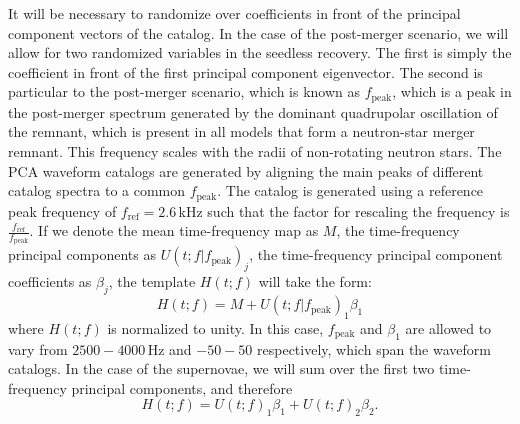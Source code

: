 \documentclass[prd,showpacs,superscriptaddress,twocolumn,
floatfix,preprintnumbers,altaffilletter]{revtex4}
\begin{document}
It will be necessary to randomize over coefficients in front of the principal component vectors of the catalog. 
In the case of the post-merger scenario, we will allow for two randomized variables in the seedless recovery. The first is simply the coefficient in front of the first principal component eigenvector. The second is particular to the post-merger scenario, which is known as $f_\textrm{peak}$, which is a peak in the post-merger spectrum generated by the dominant quadrupolar oscillation of the remnant, which is present in all models that form a neutron-star merger remnant. This frequency scales with the radii of non-rotating neutron stars. The PCA waveform catalogs are generated by aligning the main peaks of different catalog spectra to a common $f_\textrm{peak}$. The catalog is generated using a reference peak frequency of $f_\textrm{ref} = 2.6$\,kHz such that the factor for rescaling the frequency is $\frac{f_\textrm{ref}}{f_\textrm{peak}}$.
If we denote the mean time-frequency map as $M$, the time-frequency principal components as $U(t;f|f_\textrm{peak})_j$, the time-frequency principal component coefficients as $\beta_j$, the template $H(t;f)$ will take the form:
\begin{equation}
H(t;f) = M + U(t;f|f_\textrm{peak})_1 \beta_1
\end{equation}
where $H(t;f)$ is normalized to unity. In this case, $f_\textrm{peak}$ and $\beta_1$ are allowed to vary from $2500 - 4000$\,Hz and $-50 - 50$ respectively, which span the waveform catalogs.
In the case of the supernovae, we will sum over the first two time-frequency principal components, and therefore
\begin{equation}
H(t;f) = U(t;f)_1 \beta_1 + U(t;f)_2 \beta_2.
\end{equation}
\end{document}

